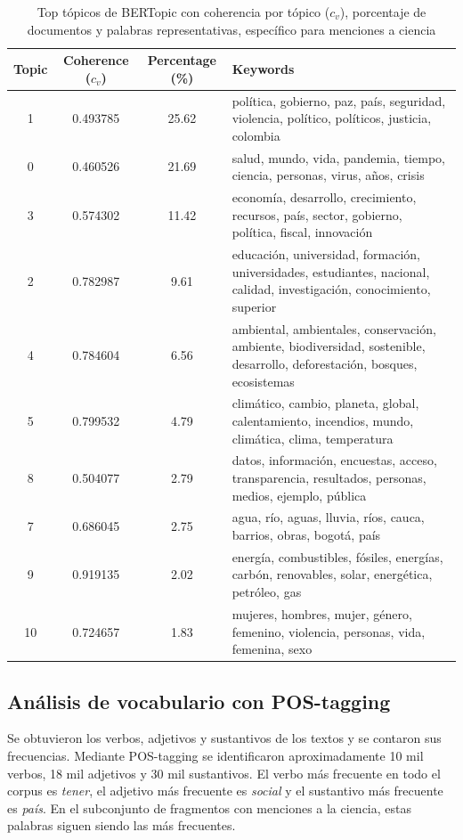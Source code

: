 \documentclass[11pt,a4paper]{article}
\begin{document}
		\begin{table}[H]
			\centering
			\small
			\begin{tabularx}{\textwidth}{c c c X}
				\hline
				\textbf{Topic} & \textbf{Coherence ($c_v$)} & \textbf{Percentage (\%)} & \textbf{Keywords} \\
				\hline
				1  & 0.493785 & 25.62 & política, gobierno, paz, país, seguridad, violencia, político, políticos, justicia, colombia \\
				0  & 0.460526 & 21.69 & salud, mundo, vida, pandemia, tiempo, ciencia, personas, virus, años, crisis \\
				3  & 0.574302 & 11.42 & economía, desarrollo, crecimiento, recursos, país, sector, gobierno, política, fiscal, innovación \\
				2  & 0.782987 & 9.61  & educación, universidad, formación, universidades, estudiantes, nacional, calidad, investigación, conocimiento, superior \\
				4  & 0.784604 & 6.56  & ambiental, ambientales, conservación, ambiente, biodiversidad, sostenible, desarrollo, deforestación, bosques, ecosistemas \\
				5  & 0.799532 & 4.79  & climático, cambio, planeta, global, calentamiento, incendios, mundo, climática, clima, temperatura \\
				8  & 0.504077 & 2.79  & datos, información, encuestas, acceso, transparencia, resultados, personas, medios, ejemplo, pública \\
				7  & 0.686045 & 2.75  & agua, río, aguas, lluvia, ríos, cauca, barrios, obras, bogotá, país \\
				9  & 0.919135 & 2.02  & energía, combustibles, fósiles, energías, carbón, renovables, solar, energética, petróleo, gas \\
				10 & 0.724657 & 1.83  & mujeres, hombres, mujer, género, femenino, violencia, personas, vida, femenina, sexo \\
				\hline
			\end{tabularx}
			\caption{Top tópicos de BERTopic con coherencia por tópico ($c_v$), porcentaje de documentos y palabras representativas, específico para menciones a ciencia}
			\label{tab:topics_ciencia}
		\end{table}
		
		
		
	\subsection{Análisis de vocabulario con POS-tagging}
Se obtuvieron los verbos, adjetivos y sustantivos de los textos y se contaron sus frecuencias. Mediante POS-tagging se identificaron aproximadamente 10 mil verbos, 18 mil adjetivos y 30 mil sustantivos. El verbo más frecuente en todo el corpus es \textit{tener}, el adjetivo más frecuente es \textit{social} y el sustantivo más frecuente es \textit{país}. En el subconjunto de fragmentos con menciones a la ciencia, estas palabras siguen siendo las más frecuentes.
\end{document}
